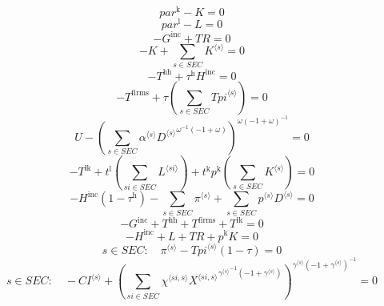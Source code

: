 \begin{equation}
{p\!a\!r}^{\mathrm{k}} - K = 0
\end{equation}
\begin{equation}
{p\!a\!r}^{\mathrm{l}} - L = 0
\end{equation}
\begin{equation}
-G^{\mathrm{inc}} + {T\!R} = 0
\end{equation}
\begin{equation}
-K + \sum_{s\in {S\!E\!C}} {K}^{\langle s\rangle} = 0
\end{equation}
\begin{equation}
-T^{\mathrm{hh}} + {\tau^{\mathrm{h}}} {H^{\mathrm{inc}}} = 0
\end{equation}
\begin{equation}
-T^{\mathrm{firms}} + {\tau} \left(\sum_{s\in {S\!E\!C}} {{T\!p\!i}}^{\langle s\rangle}\right) = 0
\end{equation}
\begin{equation}
U - \left(\sum_{s\in {S\!E\!C}} {{\alpha}^{\langle s\rangle}} {{{D}^{\langle s\rangle}}^{{\omega}^{-1} \left(-1 + \omega\right)}}\right)^{{\omega} \left(-1 + \omega\right)^{-1}} = 0
\end{equation}
\begin{equation}
-T^{\mathrm{lk}} + {t^{\mathrm{l}}} \left(\sum_{{s\!i}\in {S\!E\!C}} {L}^{\langle {s\!i}\rangle}\right) + {t^{\mathrm{k}}} {p^{\mathrm{k}}} \left(\sum_{s\in {S\!E\!C}} {K}^{\langle s\rangle}\right) = 0
\end{equation}
\begin{equation}
-{H^{\mathrm{inc}}} \left(1 - \tau^{\mathrm{h}}\right) - \sum_{s\in {S\!E\!C}} {\pi}^{\langle s\rangle} + \sum_{s\in {S\!E\!C}} {{p}^{\langle s\rangle}} {{D}^{\langle s\rangle}} = 0
\end{equation}
\begin{equation}
-G^{\mathrm{inc}} + T^{\mathrm{hh}} + T^{\mathrm{firms}} + T^{\mathrm{lk}} = 0
\end{equation}
\begin{equation}
-H^{\mathrm{inc}} + L + {T\!R} + {p^{\mathrm{k}}} {K} = 0
\end{equation}
\begin{equation}
s\in {S\!E\!C}\colon\quad {\pi}^{\langle s\rangle} - {{{T\!p\!i}}^{\langle s\rangle}} \left(1 - \tau\right) = 0
\end{equation}
\begin{equation}
s\in {S\!E\!C}\colon\quad -{{C\!I}}^{\langle s\rangle} + \left(\sum_{{s\!i}\in {S\!E\!C}} {{\chi}^{\langle {s\!i},s\rangle}} {{{X}^{\langle {s\!i},s\rangle}}^{{{\gamma}^{\langle s\rangle}}^{-1} \left(-1 + {\gamma}^{\langle s\rangle}\right)}}\right)^{{{\gamma}^{\langle s\rangle}} \left(-1 + {\gamma}^{\langle s\rangle}\right)^{-1}} = 0
\end{equation}
